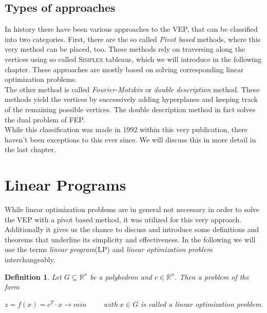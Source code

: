 \documentclass[a4paper, 11pt]{article}
\makeatletter
\newtheorem{mydef}{Definition}
\renewenvironment{quotation}
{\list{}{\listparindent=1.5em
		\itemindent=0pt
		\parsep\z@ \@plus\p@}%
	\item\relax}
{\endlist}
\makeatother
\begin{document}
\subsection{Types of approaches}
In history there have been various approaches to the VEP, that can be classified into two categories. First, there are the so called \textit{Pivot based} methods, where this very method can be placed, too. These methods rely on traversing along the vertices using so called \textsc{Simplex} tableaus, which we will introduce in the following chapter. These approaches are mostly based on solving corresponding linear optimization problems.\\

The other method is called \textit{Fourier-Motzkin} or \textit{double description} method\cite{Motzkin}. These methods yield the vertices by successively adding hyperplanes and keeping track of the remaining possible vertices. The double description method in fact solves the dual problem of FEP. \\

While this classification was made in 1992 within this very publication, there haven't been exceptions to this ever since. We will discuss this in more detail in the last chapter.

\section{Linear Programs}
While linear optimization problems are in general not necessary in order to solve the VEP with a pivot based method, it was utilized for this very approach. Additionally it gives us the chance to discuss and introduce some definitions and theorems that underline its simplicity and effectiveness. In the following we will use the terms \textit{linear program}(LP) and \textit{linear optimization problem} interchangeably.\\

\begin{mydef}
	Let $ G \subseteq \mathbb{R}^n$ be a polyhedron and $ c \in \mathbb{R}^n$. Then a problem of the form \\
	\vspace{0.15cm}
	\begin{quotation}
		$ z = f(x) = c^T \cdot x \rightarrow min\hspace{1cm} with\ x \in G$
	\end{quotation} 
	is called a \emph{linear} optimization problem.
\end{mydef}
\end{document}
